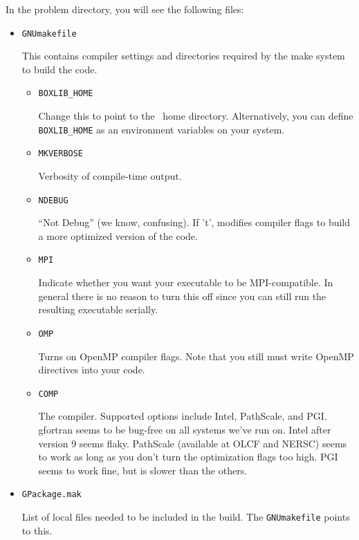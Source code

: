 In the problem directory, you will see the following files:
\begin{itemize}
\item {\tt GNUmakefile}

This contains compiler settings and directories required by the make system to build the code.

  \begin{itemize}

    \item {\tt BOXLIB\_HOME}

    Change this to point to the \BoxLib\ home directory.  Alternatively, you can define {\tt BOXLIB\_HOME}
    as an environment variables on your system.

    \item {\tt MKVERBOSE}

    Verbosity of compile-time output.

    \item {\tt NDEBUG}
      
    ``Not Debug'' (we know, confusing).  If 't', modifies compiler flags to build a more optimized version
    of the code.

    \item {\tt MPI}

    Indicate whether you want your executable to be MPI-compatible.  In general there is no reason to turn this
    off since you can still run the resulting executable serially.

    \item {\tt OMP}

    Turns on OpenMP compiler flags.  Note that you still must write OpenMP directives into your code.

    \item {\tt COMP}

    The compiler.  Supported options include Intel, PathScale, and PGI.  gfortran seems to be bug-free
    on all systems we've run on.  Intel after version 9 seems flaky.  PathScale (available at OLCF and NERSC)
    seems to work as long as you don't turn the optimization flags too high.  PGI seems to work fine, but
    is slower than the others.

  \end{itemize}

\item {\tt GPackage.mak}

List of local files needed to be included in the build.  The {\tt GNUmakefile} points to this.


\end{itemize}
